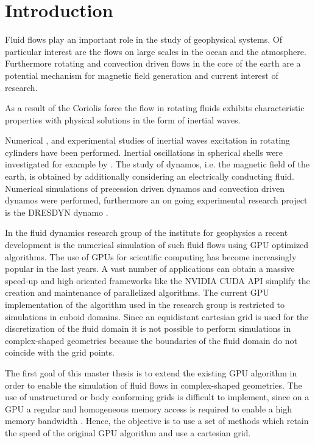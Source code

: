 \chapter*{Introduction}

Fluid flows play an important role in the study of geophysical systems.
Of particular interest are the flows on large scales in the ocean and the atmosphere.
Furthermore rotating and convection driven flows in the core of the earth are a potential mechanism
for magnetic field generation and current interest of research.

As a result of the Coriolis force the flow in rotating fluids exhibits characteristic properties with
physical solutions in the form of inertial waves.

Numerical \citep{Sauret2012}, \citep{Duguet} and experimental
studies \citep{Fultz1959} of inertial waves excitation in rotating cylinders have been performed.
Inertial oscillations in spherical shells were investigated for example by \citep{Tilgner1999}.
The study of dynamos, i.e. the magnetic field of the earth, is obtained by additionally
considering an electrically conducting fluid.
Numerical simulations of precession driven dynamos \citep{Tilgner2005}
and convection driven dynamos \citep{Tilgner2012} were performed, furthermore
an on going experimental research project is the DRESDYN dynamo \citep{Stefani2015}.

In the fluid dynamics research group of the institute for geophysics
a recent development is the numerical simulation of such fluid flows using GPU optimized algorithms.
The use of GPUs for scientific computing has become increasingly popular in the last years.
A vast number of applications  can obtain a massive speed-up and
high oriented frameworks like the NVIDIA CUDA API simplify the creation
and maintenance of parallelized algorithms.
The current GPU implementation of the algorithm used in the research group is restricted
to simulations in cuboid domains.
Since an equidistant cartesian grid is used for the discretization of the fluid
domain it is not possible to perform simulations in complex-shaped geometries
because the boundaries of the fluid domain  do not coincide with the grid points.

\bigbreak

The first goal of this master thesis is to extend the existing GPU algorithm
in order to enable the simulation of fluid flows in complex-shaped geometries.
The use of unstructured or body conforming grids is difficult to implement,
since on a GPU a regular and homogeneous memory access is required to enable a high memory bandwidth \citep{CUDABP}.
Hence, the objective is to use a set of methods which retain the speed of the original GPU algorithm and use a cartesian grid.

